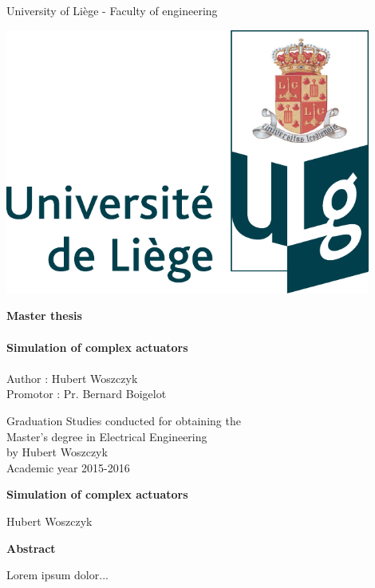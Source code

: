 \begin{titlepage}


\begin{center}
\large
University of Liège - Faculty of engineering
\end{center}

\vfill

\begin{minipage}{0.5\textwidth}
\includegraphics[width=0.9\textwidth]{figures/ULg_logo_couleur.pdf}
\end{minipage}
\begin{minipage}{0.5\textwidth}
\huge
\textbf{Master thesis}\\\\
\normalsize
\textbf{Simulation of complex actuators}\\\\
Author : Hubert Woszczyk\\
Promotor : Pr. Bernard Boigelot\\
\end{minipage}

\vfill
\begin{center}
\large
Graduation Studies conducted for obtaining the\\ Master's degree in Electrical Engineering\\ by Hubert Woszczyk\\
\vspace*{8cm}
\normalsize
Academic year 2015-2016
\end{center}

\end{titlepage}

\newpage\null\thispagestyle{empty}\newpage

\thispagestyle{empty}
\begin{center}
    \Large
    \textbf{Simulation of complex actuators}
        
    \vspace{0.4cm}
    \large
    Hubert Woszczyk
    \normalsize
    
    \vspace{0.9cm}
    \textbf{Abstract}
\end{center}
Lorem ipsum dolor...

